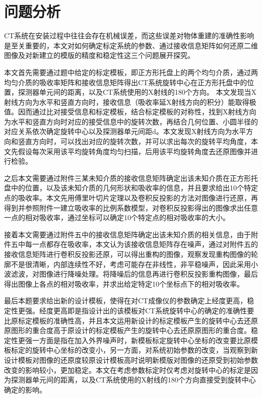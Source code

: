 \documentclass[withoutpreface,bwprint]{cumcmthesis} %
\begin{document}
\section{问题分析}
\par CT系统在安装过程中往往会存在机械误差，而这些误差对物体重建的准确性影响是至关重要的，本文对如何确定标定系统的参数、通过接收信息矩阵如何还原二维图像及对新建立的模版的精度和稳定性这三个问题展开探究。 
\par 本文首先需要通过题中给定的标定模板，即正方形托盘上的两个均匀介质，通过两均匀介质的吸收率矩阵和接收信息矩阵得出CT系统旋转中心在正方形托盘中的位置，探测器单元间的距离，以及CT系统使用的X射线的180个方向。 本文发现当X射线方向为水平和竖直方向时，接收信息（吸收率延X射线方向的积分）能取得极值。因而通过比对接受信息和标定模板，结合标定模板的对称性，找到X射线方向为水平和竖直方向时对应的接受信息中的旋转次数，再结合几何位置、小圆半径的对应关系依次确定旋转中心以及探测器单元间距d。本文发现X射线方向为水平方向和竖直方向时，可以找出对应的旋转次数，并可以求出每次的旋转平均角度，本文先假设每次采用该平均旋转角度均匀扫描，后用该平均旋转角度去还原图像并进行检验。
\par 之后本文需要通过附件三某未知介质的接收信息矩阵确定出该未知介质在正方形托盘中的位置，以及该未知介质的几何形状和吸收率的信息，并且要求给出10个特定点的吸收率。本文先用傅里叶切片定理以及卷积反投影的方法对图像进行还原，再得到并参照附件一建立吸收率的比例系数模型，对卷积反投影得出的图像求出任意一点的相对吸收率，通过坐标可以确定10个特定点的相对吸收率的大小。
\par 接着本文需要通过附件五中的接收信息矩阵确定出该未知介质的相关信息，由于附件五中每一点都存在吸收率，本文认为该接收信息矩阵存在噪声，通过对附件五的接收信息矩阵进行卷积反投影还原，可以得出重构的图像，观察发现重构图像的轮廓不是很清晰，内部连续性不好，考虑可能存在非线性，非平稳噪声，因此采用小波滤波，对图像进行降噪处理。将降噪后的信息再进行卷积反投影重构图像，最后得出图像上各点的相对吸收率，并求出给定特定10个坐标点下的相对吸收率。
\par 最后本题要求给出新的设计模板，使得在对CT成像仪的参数确定上经度更高，稳定性更强。经度更高即是指设计出的该模板对CT系统旋转中心的确定的准确性要比原标定模板的准确性高，并且本文运用新设计的标定模板产生的旋转中心去还原原图形的重合度高于原设计的标定模板产生的旋转中心去还原原图形的重合度。稳定性更强一方面是指在加入外界噪声时，新模板标定旋转中心坐标的改变要比原模板标定的旋转中心坐标的改变小，另一方面，对系统初始参数的改变，当观察到新设计模板对图像的还原度较原设计模板高时说明新模版对图像的还原受到初始参数改变的影响较小，更加稳定。本文在考虑参数标定时仅考虑对旋转中心的标定是因为探测器单元间的距离，以及CT系统使用的X射线的180个方向直接受到旋转中心确定的影响。
\end{document}
